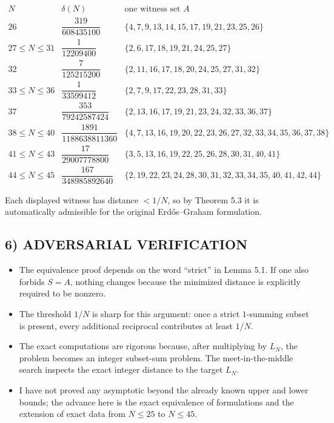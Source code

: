 \[
\begin{array}{c|c|l}
N & \delta(N) & \text{one witness set }A \\
\hline
26 & \dfrac{319}{608435100} & \{4,7,9,13,14,15,17,19,21,23,25,26\} \\
27\le N\le 31 & \dfrac{1}{12209400} & \{2,6,17,18,19,21,24,25,27\} \\
32 & \dfrac{7}{125215200} & \{2,11,16,17,18,20,24,25,27,31,32\} \\
33\le N\le 36 & \dfrac{1}{33599412} & \{2,7,9,17,22,23,28,31,33\} \\
37 & \dfrac{353}{79242587424} & \{2,13,16,17,19,21,23,24,32,33,36,37\} \\
38\le N\le 40 & \dfrac{1891}{1188638811360} & \{4,7,13,16,19,20,22,23,26,27,32,33,34,35,36,37,38\} \\
41\le N\le 43 & \dfrac{17}{29007778800} & \{3,5,13,16,19,22,25,26,28,30,31,40,41\} \\
44\le N\le 45 & \dfrac{167}{348985892640} & \{2,19,22,23,24,28,30,31,32,33,34,35,40,41,42,44\}
\end{array}
\]

Each displayed witness has distance $<1/N$, so by Theorem 5.3 it is automatically admissible for the original Erd\H{o}s--Graham formulation.

\subsection*{6) ADVERSARIAL VERIFICATION}
\begin{itemize}
\item The equivalence proof depends on the word ``strict'' in Lemma 5.1. If one also forbids $S=A$, nothing changes because the minimized distance is explicitly required to be nonzero.
\item The threshold $1/N$ is sharp for this argument: once a strict $1$-summing subset is present, every additional reciprocal contributes at least $1/N$.
\item The exact computations are rigorous because, after multiplying by $L_N$, the problem becomes an integer subset-sum problem. The meet-in-the-middle search inspects the exact integer distance to the target $L_N$.
\item I have not proved any asymptotic beyond the already known upper and lower bounds; the advance here is the exact equivalence of formulations and the extension of exact data from $N\le 25$ to $N\le 45$.
\end{itemize}

